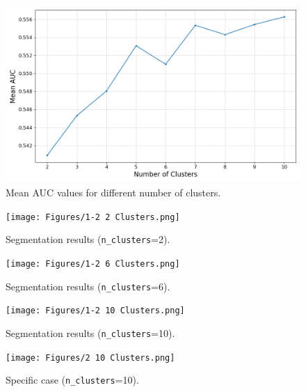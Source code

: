 \documentclass[final]{article}
\begin{document}
\begin{figure}[H]
    \centering
    \includegraphics[scale=0.5]{Figures/1-1 Find the Best n_clusters.png}
    \vspace{-0.25cm}
    \caption{Mean AUC values for different number of clusters.}
    \label{fig:nclusters}
\end{figure}
\begin{figure}[H]
    \centering
    \texttt{[image: Figures/1-2 2 Clusters.png]}
    \vspace{-0.25cm}
    \caption{Segmentation results (\texttt{n\_clusters}=2).}
    \label{fig:n=2}
\end{figure}
\begin{figure}[H]
    \centering
    \texttt{[image: Figures/1-2 6 Clusters.png]}
    \vspace{-0.25cm}
    \caption{Segmentation results (\texttt{n\_clusters}=6).}
    \label{fig:n=6}
\end{figure}
\begin{figure}[H]
    \centering
    \texttt{[image: Figures/1-2 10 Clusters.png]}
    \vspace{-0.25cm}
    \caption{Segmentation results (\texttt{n\_clusters}=10).}
    \label{fig:n=10}
\end{figure}
\begin{figure}[H]
    \centering
    \texttt{[image: Figures/2 10 Clusters.png]}
    \vspace{-0.25cm}
    \caption{Specific case (\texttt{n\_clusters}=10).}
    \label{fig:specificcase}
\end{figure}
\end{document}
